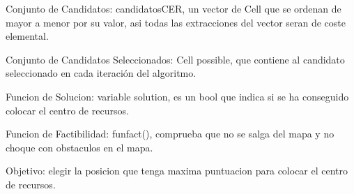 Conjunto de Candidatos: candidatosCER, un vector de Cell que se ordenan de mayor a menor por su valor, asi todas las extracciones del vector seran de coste elemental.

Conjunto de Candidatos Seleccionados: Cell possible, que contiene al candidato seleccionado en cada iteración del algoritmo.

Funcion de Solucion: variable solution, es un bool que indica si se ha conseguido colocar el centro de recursos.

Funcion de Factibilidad: funfact(), comprueba que no se salga del mapa y no choque con obstaculos en el mapa.

Objetivo: elegir la posicion que tenga maxima puntuacion para colocar el centro de recursos.


